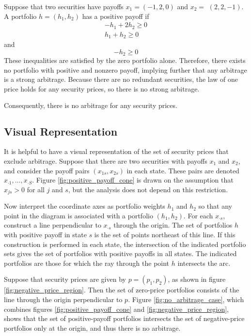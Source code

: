 \documentclass[\topdir/lecture\_notes.tex]{subfiles}
\begin{document}
\begin{example}\label{ex:no_positive_payoff}
Suppose that two securities have payoffs \(x_{1}=(-1,2,0)\) and \(x_{2}=\) $(2,2,-1)$. A portfolio \(h=\left(h_{1}, h_{2}\right)\) has a positive payoff if
\begin{gather*}
-h_{1}+2 h_{2} \geq 0 \\
h_{1}+h_{2} \geq 0 
\end{gather*}
and
\begin{equation*}
-h_{2} \geq 0 
\end{equation*}
These inequalities are satisfied by the zero portfolio alone. Therefore, there exists no portfolio with positive and nonzero payoff, implying further that any arbitrage is a strong arbitrage. Because there are no redundant securities, the law of one price holds for any security prices, so there is no strong arbitrage. 

Consequently, there is no arbitrage for any security prices.
\end{example}

\subsection{Visual Representation}
It is helpful to have a visual representation of the set of security prices that exclude arbitrage. Suppose that there are two securities with payoffs \(x_{1}\) and \(x_{2}\), and consider the payoff pairs \(\left(x_{1 s}, x_{2 s}\right)\) in each state. These pairs are denoted \(x_{\cdot 1}, \ldots, x_{\cdot S}\). Figure \ref{fig:positive_payoff_cone} is drawn on the assumption that \(x_{j s}>0\) for all \(j\) and \(s\), but the analysis does not depend on this restriction.

Now interpret the coordinate axes as portfolio weights \(h_{1}\) and \(h_{2}\) so that any point in the diagram is associated with a portfolio \(\left(h_{1}, h_{2}\right)\). For each \(x_{\cdot s}\), construct a line perpendicular to \(x_{\cdot s}\) through the origin. The set of portfolios \(h\) with positive payoff in state \(s\) is the set of points northeast of this line. If this construction is performed in each state, the intersection of the indicated portfolio sets gives the set of portfolios with positive payoffs in all states. The indicated portfolios are those for which the ray through the point \(h\) intersects the arc.

Suppose that security prices are given by \(p=\left(p_{1}, p_{2}\right)\), as shown in figure \ref{fig:negative_price_region}. Then the set of zero-price portfolios consists of the line through the origin perpendicular to \(p\). Figure \ref{fig:no_arbitrage_case}, which combines figures \ref{fig:positive_payoff_cone} and \ref{fig:negative_price_region}, shows that the set of positive-payoff portfolios intersects the set of negative-price portfolios only at the origin, and thus there is no arbitrage.
\end{document}
